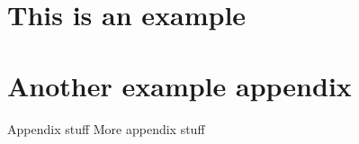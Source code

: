 \section{This is an example}
\label{appendix:example1}

\pagebreak
\section{Another example appendix}
\label{appendix:example2}
\newpage
Appendix stuff
\newpage
More appendix stuff